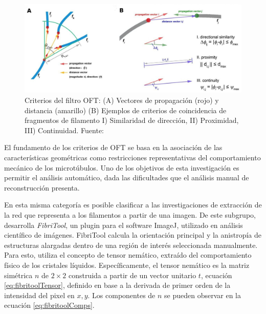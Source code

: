 \begin{figure}[h]
        \centering
        \includegraphics[scale=1.3]{imagenes/MT-OFT.jpeg}
        \caption{Criterios del filtro OFT: (A) Vectores de propagaci\'on (rojo) y distancia (amarillo) (B) Ejemplos de criterios de coincidencia de fragmentos de filamento I) Similaridad de direcci\'on, II) Proximidad, III) Continuidad. Fuente: \cite{zhang2017extracting}}
        \label{fig:MTOFT}
\end{figure}


El fundamento de los criterios de OFT se basa en la asociaci\'on de las caracter\'isticas geom\'etricas como restricciones representativas del comportamiento mec\'anico de los microt\'ubulos. Uno de los objetivos de esta investigaci\'on es permitir el an\'alisis autom\'atico, dada las dificultades que el an\'alisis manual de reconstrucci\'on presenta. %


En esta misma categor\'ia es posible clasificar a las investigaciones de extracci\'on de la red que representa a los filamentos a partir de una imagen\cite{doi:10.1021/ma502264c}\cite{boudaoud2014fibriltool}\cite{lichtenstein2003quantitative}\cite{alioscha2016robust}\cite{xu2015soax}\cite{asgharzadeh2018computational}.
De este subgrupo, \cite{boudaoud2014fibriltool} desarrolla \textit{FibriTool}, un plugin para el software ImageJ, utilizado en an\'alisis cient\'ifico de im\'agenes. FibriTool calcula la orientaci\'on principal y la anistrop\'ia de estructuras alargadas dentro de una regi\'on de inter\'es seleccionada manualmente. Para esto, utiliza el concepto de tensor nem\'atico, extra\'ido del comportamiento f\'isico de los cristales l\'iquidos. Espec\'ificamente, el tensor nem\'atico es la matriz sim\'etrica $n$ de $2\times2$ construida a partir de un vector unitario $t$, ecuaci\'on \eqref{eq:fibritoolTensor}, definido en base a la derivada de primer orden de la intensidad del pixel en $x,y$. Los componentes de $n$ se pueden observar en la ecuaci\'on \eqref{eq:fibritoolComps}.


